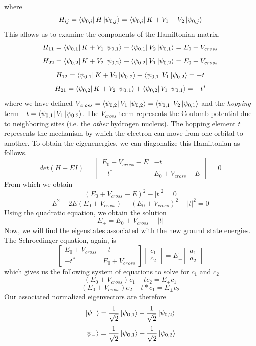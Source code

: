 \documentclass{article}
\begin{document}
where
$$H_{ij} = \bra{\psi_{0,i}}H\ket{\psi_{0,j}} = \bra{\psi_{0,i}}K + V_{1} + V_{2}\ket{\psi_{0,j}}$$
This allows us to examine the components of the Hamiltonian matrix.
$$H_{11} = \bra{\psi_{0,1}}K + V_{1}\ket{\psi_{0,1}} + \bra{\psi_{0,1}}V_{2}\ket{\psi_{0,1}} = E_{0} + V_{cross}$$
$$H_{22} = \bra{\psi_{0,2}}K + V_{2}\ket{\psi_{0,2}} + \bra{\psi_{0,2}}V_{1}\ket{\psi_{0,2}} = E_{0} + V_{cross}$$
$$H_{12} = \bra{\psi_{0,1}}K + V_{2}\ket{\psi_{0,2}} + \bra{\psi_{0,1}}V_{1}\ket{\psi_{0,2}} = -t$$
$$H_{21} = \bra{\psi_{0,2}}K + V_{2}\ket{\psi_{0,1}} + \bra{\psi_{0,2}}V_{1}\ket{\psi_{0,1}} = -t^{*}$$
where we have defined $V_{cross} = \bra{\psi_{0,2}}V_{1}\ket{\psi_{0,2}} = \bra{\psi_{0,1}}V_{2}\ket{\psi_{0,1}}$ and the \emph{hopping} term $ -t = \bra{\psi_{0,1}}V_{1}\ket{\psi_{0,2}}$. The $V_{cross}$ term represents the Coulomb potential
due to neighboring sites (i.e. the \emph{other} hydrogen nucleus). The hopping element $t$ represents the mechanism by which the electron can move from one orbital to another. To obtain the eigenenergies, we can diagonalize this Hamiltonian as follows.
$$det(H - EI) = \begin{vmatrix} E_{0} + V_{cross} - E & -t \\ -t^{*} & E_{0} + V_{cross} - E\end{vmatrix} = 0$$
From which we obtain
$$  (E_{0} + V_{cross} - E)^{2} - |t|^{2} = 0$$
$$ E^{2} - 2E(E_{0} + V_{cross}) + (E_{0} + V_{cross})^{2} - |t|^{2} = 0$$
Using the quadratic equation, we obtain the solution
$$E_{\pm} = E_{0} + V_{cross} \pm |t|$$
Now, we will find the eigenstates associated with the new ground state energies. The Schroedinger equation, again, is
$$ \begin{bmatrix} E_{0} + V_{cross} & -t\\ -t^{*} & E_{0} + V_{cross} \end{bmatrix}\begin{bmatrix} c_{1} \\ c_{2} \end{bmatrix} = E_{\pm}\begin{bmatrix} a_{1} \\ a_{2} \end{bmatrix}$$
which gives us the following system of equations to solve for $c_{1}$ and $c_{2}$
$$ (E_{0} + V_{cross})c_{1} -tc_{2} = E_{\pm}c_{1} $$
$$ (E_{0} + V_{cross})c_{2} -t*c_{1} = E_{\pm}c_{2} $$
Our associated normalized eigenvectors are therefore
$$\ket{\psi_{+}} = \frac{1}{\sqrt{2}}\ket{\psi_{0,1}} - \frac{1}{\sqrt{2}}\ket{\psi_{0,2}}$$
$$\ket{\psi_{-}} = \frac{1}{\sqrt{2}}\ket{\psi_{0,1}} + \frac{1}{\sqrt{2}}\ket{\psi_{0,2}}$$
\end{document}
